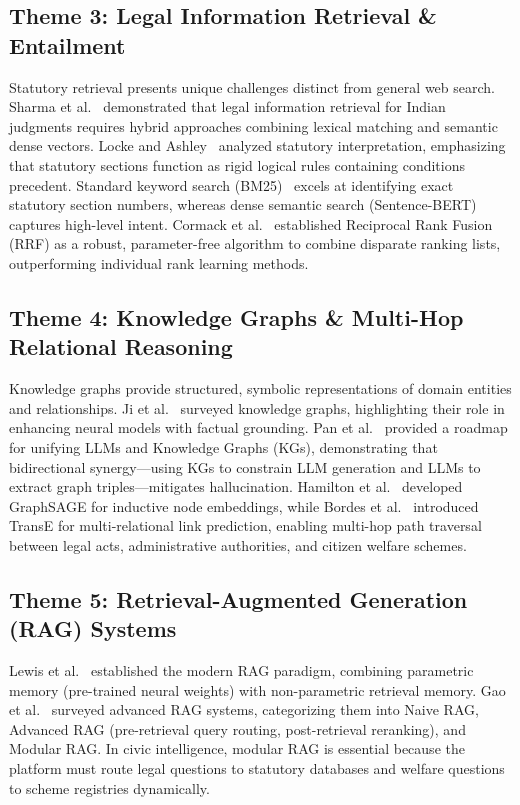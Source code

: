 \subsection{Theme 3: Legal Information Retrieval \& Entailment}
Statutory retrieval presents unique challenges distinct from general web search. Sharma et al.~\cite{sharma2023legal} demonstrated that legal information retrieval for Indian judgments requires hybrid approaches combining lexical matching and semantic dense vectors. Locke and Ashley~\cite{locke1995statute} analyzed statutory interpretation, emphasizing that statutory sections function as rigid logical rules containing conditions precedent. Standard keyword search (BM25)~\cite{robertson2009probabilistic} excels at identifying exact statutory section numbers, whereas dense semantic search (Sentence-BERT)~\cite{reimers2019sentence} captures high-level intent. Cormack et al.~\cite{cormack2009reciprocal} established Reciprocal Rank Fusion (RRF) as a robust, parameter-free algorithm to combine disparate ranking lists, outperforming individual rank learning methods.

\subsection{Theme 4: Knowledge Graphs \& Multi-Hop Relational Reasoning}
Knowledge graphs provide structured, symbolic representations of domain entities and relationships. Ji et al.~\cite{ji2022survey} surveyed knowledge graphs, highlighting their role in enhancing neural models with factual grounding. Pan et al.~\cite{pan2024unifying} provided a roadmap for unifying LLMs and Knowledge Graphs (KGs), demonstrating that bidirectional synergy---using KGs to constrain LLM generation and LLMs to extract graph triples---mitigates hallucination. Hamilton et al.~\cite{hamilton2017inductive} developed GraphSAGE for inductive node embeddings, while Bordes et al.~\cite{bordes2013translating} introduced TransE for multi-relational link prediction, enabling multi-hop path traversal between legal acts, administrative authorities, and citizen welfare schemes.

\subsection{Theme 5: Retrieval-Augmented Generation (RAG) Systems}
Lewis et al.~\cite{lewis2020retrieval} established the modern RAG paradigm, combining parametric memory (pre-trained neural weights) with non-parametric retrieval memory. Gao et al.~\cite{gao2023retrieval} surveyed advanced RAG systems, categorizing them into Naive RAG, Advanced RAG (pre-retrieval query routing, post-retrieval reranking), and Modular RAG. In civic intelligence, modular RAG is essential because the platform must route legal questions to statutory databases and welfare questions to scheme registries dynamically.

